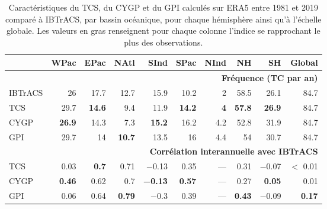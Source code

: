 \documentclass[../main.tex]{subfiles}
\begin{document}
\begin{table}[tb]
    \centering
    \caption{Caractéristiques du TCS, du CYGP et du GPI calculés sur ERA5 entre 1981 et 2019 comparé à IBTrACS, par bassin océanique, pour chaque hémisphère
    ainsi qu'à l'échelle globale. Les valeurs en gras renseignent pour chaque colonne l'indice se rapprochant le plus des observations.}
    \begin{tabular}{lrrrrrrrrr}
        \toprule\toprule
        & WPac & EPac & NAtl & SInd & SPac & NInd & NH & SH & Global\\
        \midrule
        \multicolumn{10}{r}{\textbf{Fréquence (TC par an)}}\\
        IBTrACS & \num{26} & \num{17.7} & \num{12.7} & \num{15.9} & \num{10.2} & \num{2} & \num{58.5} & \num{26.1} & \num{84.7}\\
        \midrule
        TCS & \num{29.7} & \textbf{\num{14.6}} & \num{9.4} & \num{11.9} & \textbf{\num{14.2}} & \textbf{\num{4}} & \textbf{\num{57.8}} & \textbf{\num{26.9}} &
        \num{84.7}\\
        CYGP & \textbf{\num{26.9}} & \num{14.3} & \num{7.3} & \textbf{\num{15.2}} & \num{16.2} & \num{4.2} & \num{52.8} & \num{31.9} & \num{84.7}\\
        GPI & \num{29.7} & \num{14} & \textbf{\num{10.7}} & \num{13.5} & \num{16} & \num{4.4} & \num{54} & \num{30.7} & \num{84.7}\\
        \midrule
        \multicolumn{10}{r}{\textbf{Corrélation interannuelle avec IBTrACS}}\\
        TCS & \num{0.03} & \textbf{\num{0.7}} & \num{0.71} & \num{-0.13} & \num{0.35} & --- & \num{0.31} & \num{-0.07} & $<$ \num{0.01} \\
        CYGP & \textbf{\num{0.46}} & \num{0.62} & \num{0.7} & \textbf{\num{-0.13}} & \textbf{\num{0.57}} & --- & \num{0.27} & \textbf{\num{0.05}} & \num{0.01}\\
        GPI & \num{0.06} & \num{0.64} & \textbf{\num{0.79}} & \num{-0.3} & \num{0.39} & --- & \textbf{\num{0.43}} & \num{-0.09} & \textbf{\num{0.17}}\\
        \bottomrule
    \end{tabular}
    \label{tab:tcs_cygp_gpi}
\end{table}
\end{document}

